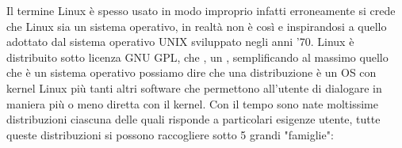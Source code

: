 Il termine Linux è spesso usato in modo improprio infatti erroneamente si crede che Linux sia un sistema operativo, in realtà non è così e  inspirandosi a quello adottato dal sistema operativo UNIX sviluppato negli anni '70.
Linux è distribuito sotto licenza GNU GPL, che , un , semplificando al massimo quello che è un sistema operativo possiamo dire che una distribuzione è un OS con kernel Linux più tanti altri software che permettono all'utente di dialogare in maniera più o meno diretta con il kernel. Con il tempo sono nate moltissime distribuzioni ciascuna delle quali risponde a particolari esigenze utente, tutte queste distribuzioni si possono raccogliere sotto 5 grandi "famiglie":

